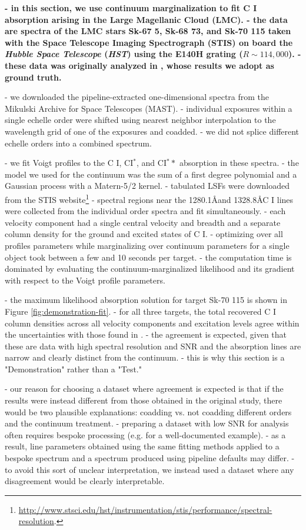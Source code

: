 \documentclass[trackchanges]{aastex62}
\begin{document}
{\color{red} \bf
- in this section, we use continuum marginalization to fit C \small{I} absorption arising in the Large Magellanic Cloud (LMC).
- the data are spectra of the LMC stars Sk-67 5, Sk-68 73, and Sk-70 115 taken with the Space Telescope Imaging Spectrograph (STIS) \citep{1998PASP..110.1183W} on board the \emph{Hubble Space Telescope} (\emph{HST}) using the E140H grating ($R \sim 114,000$).
- these data was originally analyzed in \citet{Welty:2016}, whose results we adopt as ground truth.

- we downloaded the pipeline-extracted one-dimensional spectra from the Mikulski Archive for Space Telescopes (MAST).
- individual exposures within a single echelle order were shifted using nearest neighbor interpolation to the wavelength grid of one of the exposures and coadded.
- we did not splice different echelle orders into a combined spectrum.

- we fit Voigt profiles to the C \small{I}, C\small{I}$^*$, and C\small{I}$^**$ absorption in these spectra.
- the model we used for the continuum was the sum of a first degree polynomial and a Gaussian process with a Matern-5/2 kernel.
- tabulated LSFs were downloaded from the STIS website\footnote{\url{http://www.stsci.edu/hst/instrumentation/stis/performance/spectral-resolution}.}
- spectral regions near the 1280.1\AA and 1328.8\AA C \small{I} lines were collected from the individual order spectra and fit simultaneously.
- each velocity component had a single central velocity and breadth and a separate column density for the ground and excited states of C \small{I}.
- optimizing over all profiles parameters while marginalizing over continuum parameters for a single object took between a few and 10 seconds per target.
- the computation time is dominated by evaluating the continuum-marginalized likelihood and its gradient with respect to the Voigt profile parameters.

- the maximum likelihood absorption solution for target Sk-70 115 is shown in Figure \ref{fig:demonstration-fit}.
- for all three targets, the total recovered C \small{I} column densities across all velocity components and excitation levels agree within the uncertainties with those found in \citet{Welty:2016}.
- the agreement is expected, given that these are data with high spectral resolution and SNR and the absorption lines are narrow and clearly distinct from the continuum.
- this is why this section is a "Demonstration" rather than a "Test."

- our reason for choosing a dataset where agreement is expected is that if the results were instead different from those obtained in the original study, there would be two plausible explanations: coadding vs. not coadding different orders and the continuum treatment.
- preparing a dataset with low SNR for analysis often requires bespoke processing (e.g. \citealt{Wakker:2015} for a well-documented example).
- as a result, line parameters obtained using the same fitting methods applied to a bespoke spectrum and a spectrum produced using pipeline defaults may differ.
- to avoid this sort of unclear interpretation, we instead used a dataset where any disagreement would be clearly interpretable.

}
\end{document}

